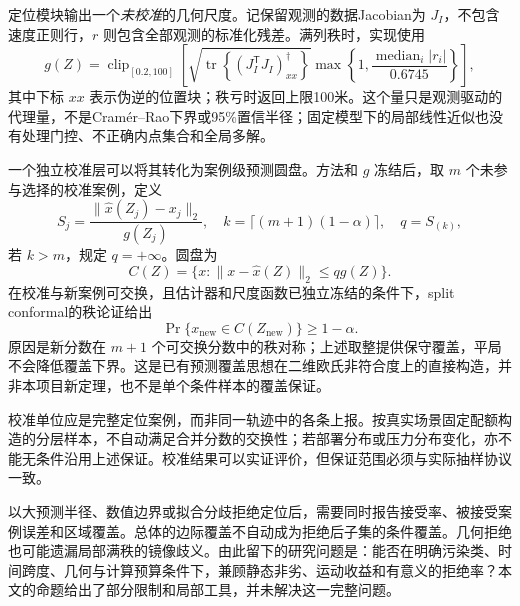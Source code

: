 定位模块输出一个\emph{未校准}的几何尺度。记保留观测的数据Jacobian为 $J_I$，不包含速度正则行，$r$ 则包含全部观测的标准化残差。满列秩时，实现使用
\begin{equation}
 g(Z)=\operatorname{clip}_{[0.2,100]}\left[
 \sqrt{\operatorname{tr}\left\{(J_I^{\mathsf T}J_I)^\dagger_{xx}\right\}}
 \max\left\{1,\frac{\operatorname{median}_i|r_i|}{0.6745}\right\}\right],
\end{equation}
其中下标 $xx$ 表示伪逆的位置块；秩亏时返回上限100米。这个量只是观测驱动的代理量，不是Cram\'{e}r--Rao下界或95\%置信半径；固定模型下的局部线性近似也没有处理门控、不正确内点集合和全局多解。

一个独立校准层可以将其转化为案例级预测圆盘。方法和 $g$ 冻结后，取 $m$ 个未参与选择的校准案例，定义
\begin{equation}
 S_j=\frac{\|\widehat x(Z_j)-x_j\|_2}{g(Z_j)},\quad
 k=\lceil(m+1)(1-\alpha)\rceil,\quad q=S_{(k)},
 \label{eq:conformal-score}
\end{equation}
若 $k>m$，规定 $q=+\infty$。圆盘为
\begin{equation}
 C(Z)=\{x:\|x-\widehat x(Z)\|_2\leq qg(Z)\}.
\end{equation}
在校准与新案例可交换，且估计器和尺度函数已独立冻结的条件下，split conformal的秩论证给出
\begin{equation}
 \Pr\{x_{\mathrm{new}}\in C(Z_{\mathrm{new}})\}\geq1-\alpha.
\end{equation}
原因是新分数在 $m+1$ 个可交换分数中的秩对称；上述取整提供保守覆盖，平局不会降低覆盖下界。这是已有预测覆盖思想在二维欧氏非符合度上的直接构造\cite{lei2018distributionfree}，并非本项目新定理，也不是单个条件样本的覆盖保证。

校准单位应是完整定位案例，而非同一轨迹中的各条上报。按真实场景固定配额构造的分层样本，不自动满足合并分数的交换性；若部署分布或压力分布变化，亦不能无条件沿用上述保证。校准结果可以实证评价，但保证范围必须与实际抽样协议一致。

以大预测半径、数值边界或拟合分歧拒绝定位后，需要同时报告接受率、被接受案例误差和区域覆盖。总体的边际覆盖不自动成为拒绝后子集的条件覆盖。几何拒绝也可能遗漏局部满秩的镜像歧义。由此留下的研究问题是：能否在明确污染类、时间跨度、几何与计算预算条件下，兼顾静态非劣、运动收益和有意义的拒绝率？本文的命题给出了部分限制和局部工具，并未解决这一完整问题。
